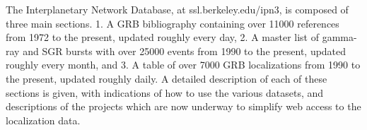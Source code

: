 


\bigskip



\bigskip

\noindent The Interplanetary Network Database, at ssl.berkeley.edu/ipn3, is composed of three main sections.
1.	A GRB bibliography containing over 11000 references from 1972 to the present, updated roughly every day,
2.	A master list of gamma-ray and SGR bursts with over 25000 events from 1990 to the present, updated roughly every month, and
3.	A table of over 7000 GRB localizations from 1990 to the present, updated roughly daily.
A detailed description of each of these sections is given, with indications of how to use the various datasets, and descriptions of the projects which are now underway to simplify web access to the localization data.


